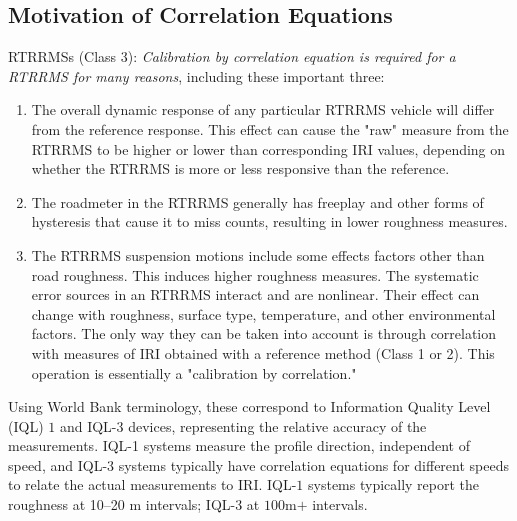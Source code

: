\documentclass[tesi]{subfiles}
\begin{document}
\subsection{Motivation of Correlation Equations}
RTRRMSs (Class 3): \cite{little_book} \textit{Calibration by correlation equation is required for a RTRRMS for many reasons}, including these important three:
\begin{enumerate}
\item The overall dynamic response of any particular RTRRMS vehicle will differ from the reference response. This effect can cause the "raw" measure from the RTRRMS to be higher or lower than corresponding IRI values, depending on whether the RTRRMS is more or less responsive than the reference.

\item The roadmeter in the RTRRMS generally has freeplay and other forms of hysteresis that cause it to miss counts, resulting in lower roughness measures.

\item The RTRRMS suspension motions include some effects factors other than road roughness. This induces higher roughness measures. The systematic error sources in an RTRRMS interact and are nonlinear. Their effect can change with roughness, surface type, temperature, and other environmental factors. The only way they can be taken into account is through correlation with measures of IRI obtained with a reference method (Class 1 or 2). This operation is essentially a "calibration by correlation."

\end{enumerate}
\noindent Using World Bank terminology, these correspond to Information Quality Level (IQL) $1$ and IQL-$3$ devices, representing the relative accuracy of the measurements\cite{bennett2006data}. IQL-1 systems measure the profile direction, independent of speed, and IQL-3 systems typically have correlation equations for different speeds to relate the actual measurements to IRI.
IQL-$1$ systems typically report the roughness at \numrange{10}{20} \si{\meter} intervals; IQL-3 at $100$\si{\meter}$+$ intervals.
\end{document}
